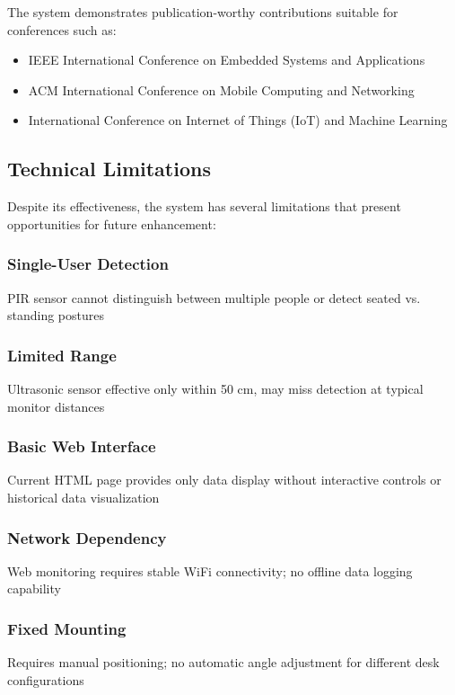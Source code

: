 \documentclass[12pt,a4paper]{article}
\begin{document}
The system demonstrates publication-worthy contributions suitable for conferences such as:
\begin{itemize}
\item IEEE International Conference on Embedded Systems and Applications
\item ACM International Conference on Mobile Computing and Networking
\item International Conference on Internet of Things (IoT) and Machine Learning
\end{itemize}

\subsection{Technical Limitations}

Despite its effectiveness, the system has several limitations that present opportunities for future enhancement:

\subsubsection{Single-User Detection}
PIR sensor cannot distinguish between multiple people or detect seated vs. standing postures

\subsubsection{Limited Range}
Ultrasonic sensor effective only within 50 cm, may miss detection at typical monitor distances

\subsubsection{Basic Web Interface}
Current HTML page provides only data display without interactive controls or historical data visualization

\subsubsection{Network Dependency}
Web monitoring requires stable WiFi connectivity; no offline data logging capability

\subsubsection{Fixed Mounting}
Requires manual positioning; no automatic angle adjustment for different desk configurations
\end{document}
